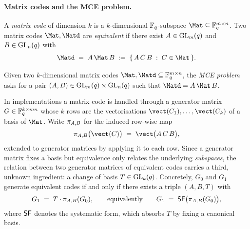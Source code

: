 \paragraph{Matrix codes and the MCE problem.}
A \emph{matrix code} of dimension $k$ is a $k$-dimensional $\mathbb{F}_q$-subspace
$\Mat \subseteq \Fq^{m \times n}$. Two matrix codes $\Mat, \Matd$ are
\emph{equivalent} if there exist $A \in \mathrm{GL}_m(q)$ and $B \in \mathrm{GL}_n(q)$ with
\[
  \Matd \;=\; A\,\Mat\,B \;:=\; \{\, A\,C\,B \;:\; C \in \Mat \,\}.
\]

\begin{definition}
\label{def:mce}
Given two $k$-dimensional matrix codes $\Mat, \Matd \subseteq \Fq^{m\times n}$,
the \emph{MCE problem} asks for a pair $(A,B) \in \mathrm{GL}_m(q) \times \mathrm{GL}_n(q)$
such that $\Matd = A\,\Mat\,B$.
\end{definition}

In implementations a matrix code is handled through a generator matrix
$G \in \mathbb{F}_q^{k \times mn}$ whose $k$ rows are the vectorisations
$\vect(C_1),\ldots,\vect(C_k)$ of a basis of $\Mat$. Write $\pi_{A,B}$ for
the induced row-wise map
\[
  \pimap{A}{B}\bigl(\vect(C)\bigr) \;=\; \vect\bigl(A\,C\,B\bigr),
\]
extended to generator matrices by applying it to each row. Since a generator
matrix fixes a basis but equivalence only relates the underlying
\emph{subspaces}, the relation between two generator matrices of equivalent
codes carries a third, unknown ingredient: a change of basis
$T \in \mathrm{GL}_k(q)$. Concretely, $G_0$ and $G_1$ generate equivalent codes if and
only if there exists a triple $(A,B,T)$ with
\begin{equation}
  \label{eq:mce-gen}
  G_1 \;=\; T \cdot \pi_{A,B}(G_0),
  \qquad\text{equivalently}\qquad
  G_1 \;=\; \mathsf{SF}\bigl(\pi_{A,B}(G_0)\bigr),
\end{equation}
where $\mathsf{SF}$ denotes the systematic form, which absorbs $T$ by fixing a
canonical basis.

